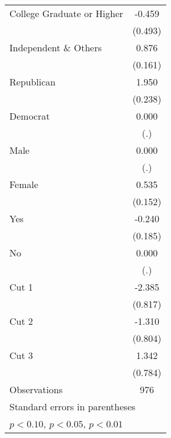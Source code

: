 \begin{table}[htbp]
\begin{tabular}{l*{1}{c}}
College Graduate or Higher&      -0.459         \\
                    &     (0.493)         \\
Independent \& Others&       0.876\sym{***}\\
                    &     (0.161)         \\
Republican          &       1.950\sym{***}\\
                    &     (0.238)         \\
Democrat            &       0.000         \\
                    &         (.)         \\
Male                &       0.000         \\
                    &         (.)         \\
Female              &       0.535\sym{***}\\
                    &     (0.152)         \\
Yes                 &      -0.240         \\
                    &     (0.185)         \\
No                  &       0.000         \\
                    &         (.)         \\
Cut 1               &      -2.385\sym{***}\\
                    &     (0.817)         \\
Cut 2               &      -1.310         \\
                    &     (0.804)         \\
Cut 3               &       1.342\sym{*}  \\
                    &     (0.784)         \\
\midrule
Observations        &         976         \\
\bottomrule
\multicolumn{2}{l}{\footnotesize Standard errors in parentheses}\\
\multicolumn{2}{l}{\footnotesize \sym{*} \(p<0.10\), \sym{**} \(p<0.05\), \sym{***} \(p<0.01\)}\\
\end{tabular}
\end{table}
